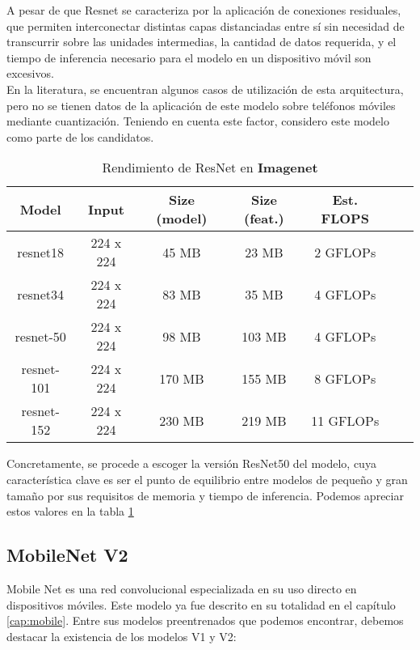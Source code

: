 A pesar de que Resnet se caracteriza por la aplicación de conexiones residuales, que permiten interconectar distintas capas distanciadas entre sí sin necesidad de transcurrir sobre las unidades intermedias, la cantidad de datos requerida, y el tiempo de inferencia necesario para el modelo en un dispositivo móvil son excesivos.\\

En la literatura, se encuentran algunos casos de utilización de esta arquitectura, pero no se tienen datos de la aplicación de este modelo sobre teléfonos móviles mediante cuantización. Teniendo en cuenta este factor, considero este modelo como parte de los candidatos.


\begin{table}[H]
	\centering
	\label{fig:tablaresnet}
	\begin{tabular}{|c|c|c|c|c|c|c|}
		\hline
		\textbf{Model} & \textbf{ Input} & \textbf {Size (model)} & \textbf{Size (feat.)} & \textbf{Est. FLOPS} \\ \hline
		resnet18 & 224 x 224 & 45 MB & 23 MB & 2 GFLOPs  \\ \hline
		resnet34 & 224 x 224 & 83 MB & 35 MB & 4 GFLOPs   \\ \hline
		resnet-50 & 224 x 224 & 98 MB & 103 MB & 4 GFLOPs   \\ \hline
		resnet-101 & 224 x 224 & 170 MB & 155 MB & 8 GFLOPs  \\ \hline
		resnet-152 & 224 x 224 & 230 MB & 219 MB & 11 GFLOPs   \\ \hline
	\end{tabular}
	\caption{Rendimiento de ResNet en \textbf{Imagenet} \cite{resnetspecs}}
\end{table}

Concretamente, se procede a escoger la versión ResNet50 del modelo, cuya característica clave es ser el punto de equilibrio entre modelos de pequeño y gran tamaño por sus requisitos de memoria y tiempo de inferencia. Podemos apreciar estos valores en la tabla \ref{fig:tablaresnet}



\subsection{MobileNet V2}

Mobile Net es una red convolucional especializada en su uso directo en dispositivos móviles. Este modelo ya fue descrito en su totalidad en el capítulo \ref{cap:mobile}. Entre sus modelos preentrenados que podemos encontrar, debemos destacar la existencia de los modelos V1 y V2:

